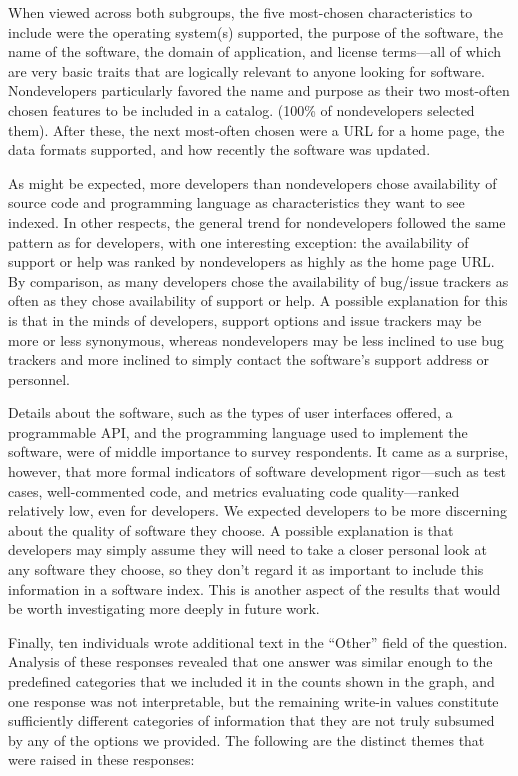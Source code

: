 \documentclass{casicswhitepaper}
\begin{document}
When viewed across both subgroups, the five most-chosen characteristics to include were the operating system(s) supported, the purpose of the software, the name of the software, the domain of application, and license terms---all of which are very basic traits that are logically relevant to anyone looking for software.  Nondevelopers particularly favored the name and purpose as their two most-often chosen features to be included in a catalog.  (100\% of nondevelopers selected them).  After these, the next most-often chosen were a URL for a home page, the data formats supported, and how recently the software was updated.

As might be expected, more developers than nondevelopers chose availability of source code and programming language as characteristics they want to see indexed.  In other respects, the general trend for nondevelopers followed the same pattern as for developers, with one interesting exception: the availability of support or help was ranked by nondevelopers as highly as the home page URL.  By comparison, as many developers chose the availability of bug/issue trackers as often as they chose availability of support or help.  A possible explanation for this is that in the minds of developers, support options and issue trackers may be more or less synonymous, whereas nondevelopers may be less inclined to use bug trackers and more inclined to simply contact the software's support address or personnel.

Details about the software, such as the types of user interfaces offered, a programmable API, and the programming language used to implement the software, were of middle importance to survey respondents.  It came as a surprise, however, that more formal indicators of software development rigor---such as test cases, well-commented code, and metrics evaluating code quality---ranked relatively low, even for developers.  We expected developers to be more discerning about the quality of software they choose.  A possible explanation is that developers may simply assume they will need to take a closer personal look at any software they choose, so they don't regard it as important to include this information in a software index.  This is another aspect of the results that would be worth investigating more deeply in future work.

Finally, ten individuals wrote additional text in the ``Other'' field of the question.  Analysis of these responses revealed that one answer was similar enough to the predefined categories that we included it in the counts shown in the graph, and one response was not interpretable, but the remaining write-in values constitute sufficiently different categories of information that they are not truly subsumed by any of the options we provided.  The following are the distinct themes that were raised in these responses:
\end{document}
